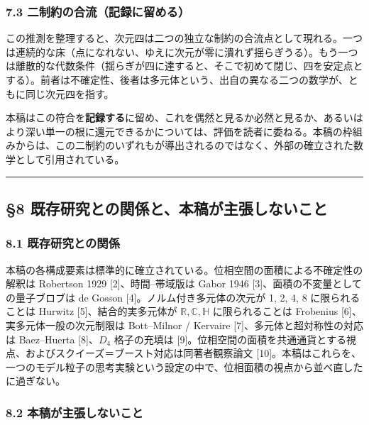 \documentclass[
]{ltjsarticle}
\begin{document}
\subsubsection{7.3
二制約の合流（記録に留める）}\label{ux4e8cux5236ux7d04ux306eux5408ux6d41ux8a18ux9332ux306bux7559ux3081ux308b}

この推測を整理すると、次元四は二つの独立な制約の合流点として現れる。一つは連続的な床（点になれない、ゆえに次元が零に潰れず揺らぎうる）。もう一つは離散的な代数条件（揺らぎが四に達すると、そこで初めて閉じ、四を安定点とする）。前者は不確定性、後者は多元体という、出自の異なる二つの数学が、ともに同じ次元四を指す。

本稿はこの符合を\textbf{記録する}に留め、これを偶然と見るか必然と見るか、あるいはより深い単一の根に還元できるかについては、評価を読者に委ねる。本稿の枠組みからは、この二制約のいずれもが導出されるのではなく、外部の確立された数学として引用されている。

\begin{center}\rule{0.5\linewidth}{0.5pt}\end{center}

\subsection{§8
既存研究との関係と、本稿が主張しないこと}\label{ux65e2ux5b58ux7814ux7a76ux3068ux306eux95a2ux4fc2ux3068ux672cux7a3fux304cux4e3bux5f35ux3057ux306aux3044ux3053ux3068}

\subsubsection{8.1
既存研究との関係}\label{ux65e2ux5b58ux7814ux7a76ux3068ux306eux95a2ux4fc2}

本稿の各構成要素は標準的に確立されている。位相空間の面積による不確定性の解釈は
Robertson 1929 {[}2{]}、時間--帯域版は Gabor 1946
{[}3{]}、面積の不変量としての量子ブロブは de Gosson
{[}4{]}。ノルム付き多元体の次元が 1, 2, 4, 8 に限られることは Hurwitz
{[}5{]}、結合的実多元体が \(\mathbb{R},\mathbb{C},\mathbb{H}\)
に限られることは Frobenius {[}6{]}、実多元体一般の次元制限は
Bott--Milnor / Kervaire {[}7{]}、多元体と超対称性の対応は Baez--Huerta
{[}8{]}、\(D_4\) 格子の充填は
{[}9{]}。位相空間の面積を共通通貨とする視点、およびスクイーズ＝ブースト対応は同著者観察論文
{[}10{]}。本稿はこれらを、一つのモデル粒子の思考実験という設定の中で、位相面積の視点から並べ直したに過ぎない。

\subsubsection{8.2
本稿が主張しないこと}\label{ux672cux7a3fux304cux4e3bux5f35ux3057ux306aux3044ux3053ux3068}
\end{document}
